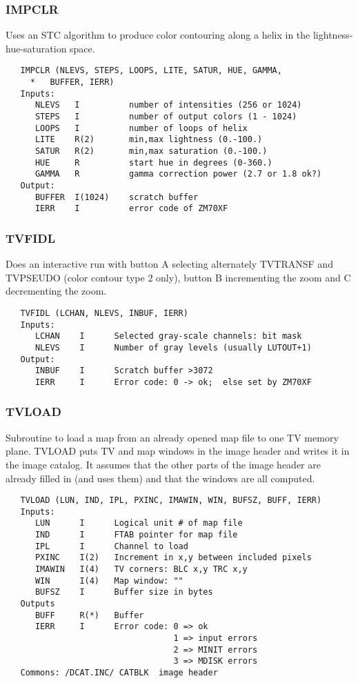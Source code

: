 \subsubsection{IMPCLR}
Uses an STC algorithm to produce color contouring along a
helix in the lightness-hue-saturation space.
\begin{verbatim}
   IMPCLR (NLEVS, STEPS, LOOPS, LITE, SATUR, HUE, GAMMA,
     *   BUFFER, IERR)
   Inputs:
      NLEVS   I          number of intensities (256 or 1024)
      STEPS   I          number of output colors (1 - 1024)
      LOOPS   I          number of loops of helix
      LITE    R(2)       min,max lightness (0.-100.)
      SATUR   R(2)       min,max saturation (0.-100.)
      HUE     R          start hue in degrees (0-360.)
      GAMMA   R          gamma correction power (2.7 or 1.8 ok?)
   Output:
      BUFFER  I(1024)    scratch buffer
      IERR    I          error code of ZM70XF
\end{verbatim}

\subsubsection{TVFIDL}
Does an interactive run with button A selecting alternately
TVTRANSF and TVPSEUDO (color contour type 2 only), button B
incrementing the zoom and C decrementing the zoom.
\begin{verbatim}
   TVFIDL (LCHAN, NLEVS, INBUF, IERR)
   Inputs:
      LCHAN    I      Selected gray-scale channels: bit mask
      NLEVS    I      Number of gray levels (usually LUTOUT+1)
   Output:
      INBUF    I      Scratch buffer >3072
      IERR     I      Error code: 0 -> ok;  else set by ZM70XF
\end{verbatim}

\subsubsection{TVLOAD}
Subroutine to load a map from an already opened map file to one
TV memory plane.  TVLOAD puts TV and map windows in the image
header and writes it in the image catalog.  It assumes that the
other parts of the image header are already filled in (and uses
them) and that the windows are all computed.
\begin{verbatim}
   TVLOAD (LUN, IND, IPL, PXINC, IMAWIN, WIN, BUFSZ, BUFF, IERR)
   Inputs:
      LUN      I      Logical unit # of map file
      IND      I      FTAB pointer for map file
      IPL      I      Channel to load
      PXINC    I(2)   Increment in x,y between included pixels
      IMAWIN   I(4)   TV corners: BLC x,y TRC x,y
      WIN      I(4)   Map window: ""
      BUFSZ    I      Buffer size in bytes
   Outputs
      BUFF     R(*)   Buffer
      IERR     I      Error code: 0 => ok
                                  1 => input errors
                                  2 => MINIT errors
                                  3 => MDISK errors
   Commons: /DCAT.INC/ CATBLK  image header
\end{verbatim}

